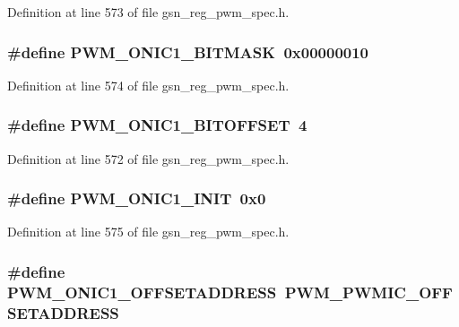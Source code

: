 Definition at line 573 of file gsn\_\-reg\_\-pwm\_\-spec.h.

\hypertarget{a00565_aee5abeb79015964b2c60680245350820}{
\subsubsection[{PWM\_\-ONIC1\_\-BITMASK}]{\setlength{\rightskip}{0pt plus 5cm}\#define PWM\_\-ONIC1\_\-BITMASK~0x00000010}}
\label{a00565_aee5abeb79015964b2c60680245350820}


Definition at line 574 of file gsn\_\-reg\_\-pwm\_\-spec.h.

\hypertarget{a00565_a70925ca11d17d6032e0d2a5cb3c64343}{
\subsubsection[{PWM\_\-ONIC1\_\-BITOFFSET}]{\setlength{\rightskip}{0pt plus 5cm}\#define PWM\_\-ONIC1\_\-BITOFFSET~4}}
\label{a00565_a70925ca11d17d6032e0d2a5cb3c64343}


Definition at line 572 of file gsn\_\-reg\_\-pwm\_\-spec.h.

\hypertarget{a00565_a72905a56a3e9112c596eb93288adc8ec}{
\subsubsection[{PWM\_\-ONIC1\_\-INIT}]{\setlength{\rightskip}{0pt plus 5cm}\#define PWM\_\-ONIC1\_\-INIT~0x0}}
\label{a00565_a72905a56a3e9112c596eb93288adc8ec}


Definition at line 575 of file gsn\_\-reg\_\-pwm\_\-spec.h.

\hypertarget{a00565_a8720f560d7ebf143f6f0838a708c2745}{
\subsubsection[{PWM\_\-ONIC1\_\-OFFSETADDRESS}]{\setlength{\rightskip}{0pt plus 5cm}\#define PWM\_\-ONIC1\_\-OFFSETADDRESS~PWM\_\-PWMIC\_\-OFFSETADDRESS}}
\label{a00565_a8720f560d7ebf143f6f0838a708c2745}


